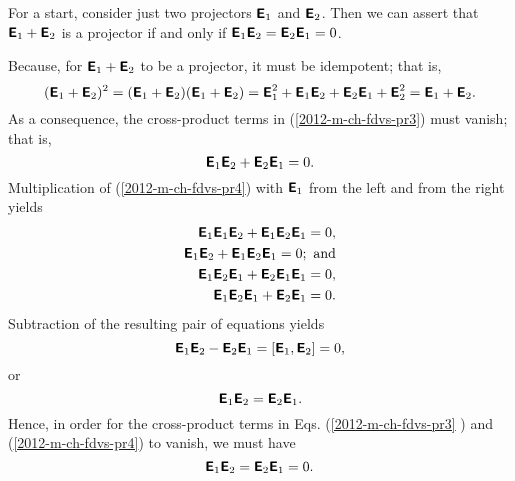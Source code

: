 {\color{OliveGreen}\bproof
For a start, consider just two projectors
 $\textsf{\textbf{E}}_1$ and $\textsf{\textbf{E}}_2$.
Then we can assert that   $\textsf{\textbf{E}}_1 + \textsf{\textbf{E}}_2$ is a projector if and only if
 $\textsf{\textbf{E}}_1 \textsf{\textbf{E}}_2=\textsf{\textbf{E}}_2 \textsf{\textbf{E}}_1=0$.

Because, for
 $\textsf{\textbf{E}}_1 + \textsf{\textbf{E}}_2$ to be a projector, it must be idempotent; that is,
 \begin{equation}
(\textsf{\textbf{E}}_1 + \textsf{\textbf{E}}_2)^2 =
(\textsf{\textbf{E}}_1 + \textsf{\textbf{E}}_2)(\textsf{\textbf{E}}_1 + \textsf{\textbf{E}}_2)  =
\textsf{\textbf{E}}_1^2 +   \textsf{\textbf{E}}_1\textsf{\textbf{E}}_2 + \textsf{\textbf{E}}_2\textsf{\textbf{E}}_1 + \textsf{\textbf{E}}_2^2
=
 \textsf{\textbf{E}}_1 + \textsf{\textbf{E}}_2 .
\label{2012-m-ch-fdvs-pr3}
\end{equation}
As a consequence, the cross-product terms in (\ref{2012-m-ch-fdvs-pr3}) must vanish; that is,
\begin{equation}
\textsf{\textbf{E}}_1\textsf{\textbf{E}}_2 + \textsf{\textbf{E}}_2\textsf{\textbf{E}}_1 =0.
\label{2012-m-ch-fdvs-pr4}
\end{equation}
Multiplication of (\ref{2012-m-ch-fdvs-pr4}) with $\textsf{\textbf{E}}_1$ from the left and from the right yields
\begin{equation}
\begin{split}
\textsf{\textbf{E}}_1\textsf{\textbf{E}}_1\textsf{\textbf{E}}_2 + \textsf{\textbf{E}}_1\textsf{\textbf{E}}_2\textsf{\textbf{E}}_1 =0, \\
 \textsf{\textbf{E}}_1\textsf{\textbf{E}}_2 + \textsf{\textbf{E}}_1\textsf{\textbf{E}}_2\textsf{\textbf{E}}_1 =0;\textrm{ and} \\
\textsf{\textbf{E}}_1\textsf{\textbf{E}}_2\textsf{\textbf{E}}_1 + \textsf{\textbf{E}}_2\textsf{\textbf{E}}_1\textsf{\textbf{E}}_1 =0, \\
\textsf{\textbf{E}}_1\textsf{\textbf{E}}_2\textsf{\textbf{E}}_1 + \textsf{\textbf{E}}_2\textsf{\textbf{E}}_1  =0.
\end{split}
\label{2012-m-ch-fdvs-pr5}
\end{equation}
Subtraction of the resulting pair of equations yields
\begin{equation}
 \textsf{\textbf{E}}_1\textsf{\textbf{E}}_2 - \textsf{\textbf{E}}_2\textsf{\textbf{E}}_1  =
\left[ \textsf{\textbf{E}}_1,\textsf{\textbf{E}}_2 \right]
=0,
\label{2012-m-ch-fdvs-pr6}
\end{equation}
or
\begin{equation}
 \textsf{\textbf{E}}_1\textsf{\textbf{E}}_2 = \textsf{\textbf{E}}_2\textsf{\textbf{E}}_1 .
\label{2012-m-ch-fdvs-pr67}
\end{equation}
Hence, in order for the cross-product terms in Eqs. (\ref{2012-m-ch-fdvs-pr3} ) and (\ref{2012-m-ch-fdvs-pr4})
to vanish, we must have
\begin{equation}
 \textsf{\textbf{E}}_1\textsf{\textbf{E}}_2 = \textsf{\textbf{E}}_2\textsf{\textbf{E}}_1 =0.
\label{2012-m-ch-fdvs-pr8}
\end{equation}

}
